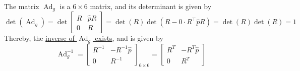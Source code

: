 The matrix \( \operatorname{Ad}_{g} \) is a \( 6 \times 6 \) matrix, and its determinant is given by
\begin{equation*}
    \det(\operatorname{Ad}_{g})
    =
    \det
    \begin{bmatrix}
        R & \widehat{p} R \\
        0 & R
    \end{bmatrix}
    =
    \det( R ) \det \left( R - 0 \cdot R^\top \widehat{p} R \right)
    =
    \det( R ) \det( R )
    =
    1
\end{equation*}
Thereby, the \underline{inverse of \( \operatorname{Ad}_{g} \) exists}, and is given by
\begin{equation*}
    \boxed{
    \operatorname{Ad}_{g}^{-1}
    =
    \begin{bmatrix}
        R^{-1} & -R^{-1} \widehat{p} \\
        0      & R^{-1}
    \end{bmatrix}_{6 \times 6}
    =
    \begin{bmatrix}
        R^{T} & -R^{T} \widehat{p} \\
        0     & R^{T}
    \end{bmatrix}
    }
\end{equation*}

